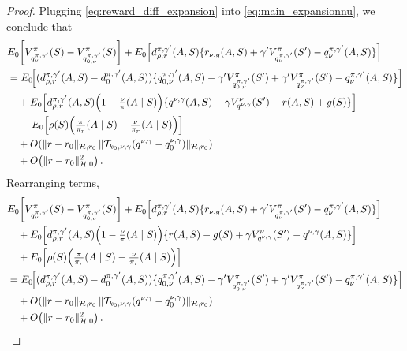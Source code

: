 \documentclass[11pt]{article}
\theoremstyle{plain}
\begin{document}
\begin{proof}
Plugging \eqref{eq:reward_diff_expansion} into \eqref{eq:main_expansionnu}, we conclude that
\begin{align*} 
& E_0\!\left[V_{q_{\nu}^{\pi,\gamma'}}^\pi(S) - V_{q_{0,\nu}^{\pi,\gamma'}}^\pi(S)\right] 
+ E_0\!\left[d_{\rho,r}^{\pi,\gamma'}(A,S)\{r_{\nu,g}(A,S) + \gamma' V_{q_{\nu}^{\pi,\gamma'}}^\pi(S') - q_{\nu}^{\pi,\gamma'}(A,S)\}\right]  \\
&= E_0\!\Big[(d_{\rho,r}^{\pi,\gamma'}(A,S) - d_0^{\pi,\gamma'}(A,S))\{q_{0,\nu}^{\pi,\gamma'}(A,S) - \gamma' V_{q_{0,\nu}^{\pi,\gamma'}}^\pi(S') + \gamma' V_{q_{\nu}^{\pi,\gamma'}}^\pi(S') - q_{\nu}^{\pi,\gamma'}(A,S)\}\Big] \\
&\quad + E_0\!\left[d_{\rho,r}^{\pi,\gamma'}(A,S)\Bigl(1 - \tfrac{\nu}{\pi}(A \mid S)\Bigr)\{q^{\nu,\gamma}(A,S) - \gamma V_{q^{\nu,\gamma}}^{\nu}(S') - r(A,S) + g(S)\}\right] \\
&\quad -\,E_0\!\left[\rho(S)\Bigl(\tfrac{\pi}{\pi_r}(A\mid S) - \tfrac{\nu}{\pi_r}(A\mid S)\Bigr)\right] \\
&\quad + O\!\left(\|r - r_0\|_{\mathcal{H},r_0}\,\|\mathcal{T}_{k_0,\nu,\gamma}(q^{\nu,\gamma} - q_0^{\nu,\gamma})\|_{\mathcal{H},r_0}\right) \\
&\quad + O\!\left(\|r - r_0\|_{\mathcal{H}, 0}^2\right).
\end{align*}
Rearranging terms,  
\begin{align*} 
& E_0\!\left[V_{q_{\nu}^{\pi,\gamma'}}^\pi(S) - V_{q_{0,\nu}^{\pi,\gamma'}}^\pi(S)\right] 
+ E_0\!\left[d_{\rho,r}^{\pi,\gamma'}(A,S)\{r_{\nu,g}(A,S) + \gamma' V_{q_{\nu}^{\pi,\gamma'}}^\pi(S') - q_{\nu}^{\pi,\gamma'}(A,S)\}\right] \\
&\quad + E_0\!\left[d_{\rho,r}^{\pi,\gamma'}(A,S)\Bigl(1 - \tfrac{\nu}{\pi}(A \mid S)\Bigr)\{r(A,S)-g(S) + \gamma V_{q^{\nu,\gamma}}^{\nu}(S') - q^{\nu,\gamma}(A,S)\}\right] \\
&\quad + E_0\!\left[\rho(S)\Bigl(\tfrac{\pi}{\pi_r}(A\mid S) - \tfrac{\nu}{\pi_r}(A\mid S)\Bigr)\right] \\
&= E_0\!\Big[(d_{\rho,r}^{\pi,\gamma'}(A,S) - d_0^{\pi,\gamma'}(A,S))\{q_{0,\nu}^{\pi,\gamma'}(A,S) - \gamma' V_{q_{0,\nu}^{\pi,\gamma'}}^\pi(S') + \gamma' V_{q_{\nu}^{\pi,\gamma'}}^\pi(S') - q_{\nu}^{\pi,\gamma'}(A,S)\}\Big] \\
&\quad + O\!\left(\|r - r_0\|_{\mathcal{H},r_0}\,\|\mathcal{T}_{k_0,\nu,\gamma}(q^{\nu,\gamma} - q_0^{\nu,\gamma})\|_{\mathcal{H},r_0}\right) \\
&\quad + O\!\left(\|r - r_0\|_{\mathcal{H}, 0}^2\right).
\end{align*}



 


 
 


 
 



\end{proof}
\end{document}
